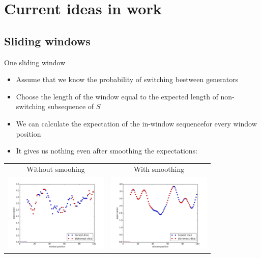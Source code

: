 \documentclass[hyperref=unicode,graphics=pdflatex,13pt]{beamer}
\begin{document}


\section{Current ideas in work}
\subsection{Sliding windows}
\begin{frame}{One sliding window}
\begin{itemize}
   \item Assume that we know the probability of switching beetween generators
   \item Choose the length of the window equal to the expected length of non-switching subsequence of $S$
   \item We can calculate the expectation of the in-window sequencefor every window position
   \item It gives us nothing even after smoothing the expectations:
   \end{itemize}
   \begin{tabular}{cc}
      Without smoohing & With smoothing \\
      \includegraphics[width=5cm]{window_expectations.png} &
      \includegraphics[width=5cm]{window_expectations_smoothed.png}
   \end{tabular}


\end{frame}
\end{document}
